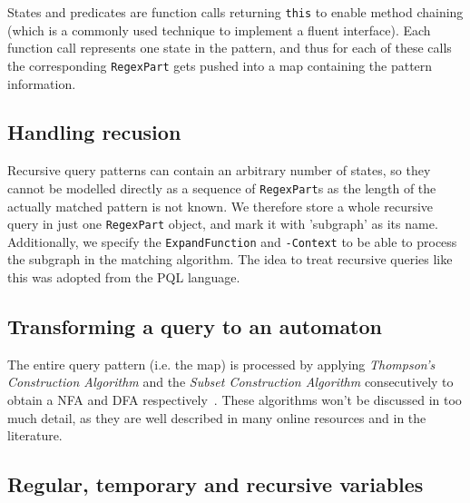States and predicates are function calls returning \texttt{this} to enable method chaining (which is a commonly used technique to implement a fluent interface). Each function call represents one state in the pattern, and thus for each of these calls the corresponding \texttt{RegexPart} gets pushed into a map containing the pattern information. 

\subsection*{Handling recusion}

 Recursive query patterns can contain an arbitrary number of states, so they cannot be modelled directly as a sequence of \texttt{RegexPart}s as the length of the actually matched pattern is not known. We therefore store a whole recursive query in just one \texttt{RegexPart} object, and mark it with 'subgraph' as its name. Additionally, we specify the \texttt{ExpandFunction} and \texttt{-Context} to be able to process the subgraph in the matching algorithm. The idea to treat recursive queries like this was adopted from the PQL language\cite{PQL}. 

\subsection*{Transforming a query to an automaton}

The entire query pattern (i.e. the map) is processed by applying \textit{Thompson's Construction Algorithm} and the \textit{Subset Construction Algorithm} consecutively to obtain a NFA and DFA respectively~\cite{Thompson}. These algorithms won't be discussed in too much detail, as they are well described in many online resources and in the literature. 

\subsection*{Regular, temporary and recursive variables}

